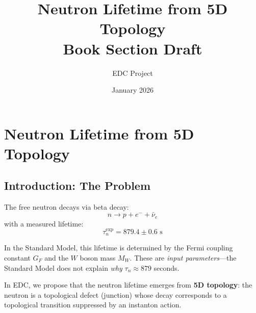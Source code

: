 \documentclass[11pt,a4paper]{article}
\title{Neutron Lifetime from 5D Topology\\[0.5em]\large Book Section Draft}
\author{EDC Project}
\date{January 2026}
\begin{document}
\maketitle

\tableofcontents
\newpage


\section{Neutron Lifetime from 5D Topology}
\label{sec:neutron-lifetime}

\subsection{Introduction: The Problem}

The free neutron decays via beta decay:
\begin{equation}
n \to p + e^- + \bar{\nu}_e
\end{equation}
with a measured lifetime:
\begin{equation}
\tau_n^{\text{exp}} = 879.4 \pm 0.6 \text{ s}
\end{equation}

In the Standard Model, this lifetime is determined by the Fermi coupling constant $G_F$ and the $W$ boson mass $M_W$. These are \emph{input parameters}---the Standard Model does not explain \emph{why} $\tau_n \approx 879$ seconds.

In EDC, we propose that the neutron lifetime emerges from \textbf{5D topology}: the neutron is a topological defect (junction) whose decay corresponds to a topological transition suppressed by an instanton action.
\end{document}
